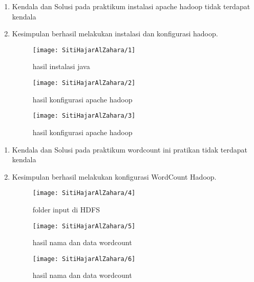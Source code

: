 
\begin{enumerate}
\item Kendala dan Solusi
\newline pada praktikum instalasi apache hadoop tidak terdapat kendala 

\item Kesimpulan
\newline berhasil melakukan instalasi dan konfigurasi hadoop.
\begin{figure}[!ht]
\texttt{[image: SitiHajarAlZahara/1]}
\caption{hasil instalasi java}
\label{gam:Hasil}
\end{figure}

\begin{figure}[!ht]
\texttt{[image: SitiHajarAlZahara/2]}
\caption{hasil konfigurasi apache hadoop}
\label{gam:Hasil}
\end{figure}

\begin{figure}[!ht]
\texttt{[image: SitiHajarAlZahara/3]}
\caption{hasil konfigurasi apache hadoop}
\label{gam:Hasil}
\end{figure}


\end{enumerate}

\begin{enumerate}
\item Kendala dan Solusi
\newline pada praktikum wordcount ini pratikan tidak terdapat kendala 

\item Kesimpulan
\newline berhasil melakukan konfigurasi WordCount Hadoop.
\begin{figure}[!ht]
\texttt{[image: SitiHajarAlZahara/4]}
\caption{ folder input di HDFS}
\label{gam:Hasil}
\end{figure}

\begin{figure}[!ht]
\texttt{[image: SitiHajarAlZahara/5]}
\caption{hasil nama dan data wordcount}
\label{gam:Hasil}
\end{figure}

\begin{figure}[!ht]
\texttt{[image: SitiHajarAlZahara/6]}
\caption{hasil nama dan data wordcount}
\label{gam:Hasil}
\end{figure}
\end{enumerate}

